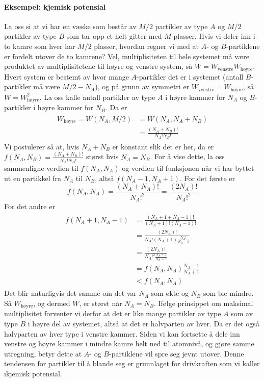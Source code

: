\paragraph{Eksempel: kjemisk potensial} La oss si at vi har en væske som består av $M/2$ partikler av type $A$ og $M/2$ partikler av type $B$ som tar opp et helt gitter med $M$ plasser. Hvis vi deler inn i to kamre som hver har $M/2$ plasser, hvordan regner vi med at $A$- og $B$-partiklene er fordelt utover de to kamrene? Vel, multiplisiteten til hele systemet må være produktet av multiplisitetene til høyre og venstre system, så $W=W_{\text{venstre}}W_{\text{høyre}}$. Hvert system er bestemt av hvor mange $A$-partikler det er i systemet (antall $B$-partikler må være $M/2-N_A$), og på grunn av symmetri er $W_{\text{venstre}}=W_{\text{høyre}}$, så $W=W_{\text{høyre}}^2$. La oss kalle antall partikler av type $A$ i høyre kammer for $N_A$ og $B$-partikler i høyre kammer for $N_B$. Da er
\begin{align}
\begin{split}
	W_{\text{høyre}}=W(N_A,M/2)&=W(N_A,N_A+N_B)\\ &=\frac{(N_A+N_B)!}{N_A!N_B!}
\end{split}
\end{align}
Vi postulerer så at, hvis $N_A+N_B$ er konstant slik det er her, da er $f(N_A,N_B)=\frac{(N_A+N_B)!}{N_A!N_B!}$ størst hvis $N_A=N_B$. For å vise dette, la oss sammenligne verdien til $f(N_A,N_A)$ og verdien til funksjonen når vi har byttet ut en partikkel fra $N_A$ til $N_B$, altså $f(N_A-1,N_A+1)$. For det første er 
\begin{equation}
    f(N_A,N_A)=\frac{(N_A+N_A)!}{N_A!^2}=\frac{(2N_A)!}{N_A!^2}
\end{equation}
For det andre er 
\begin{align}
\begin{split}
    f(N_A+1,N_A-1)&=\frac{(N_A+1+N_A-1)!}{(N_A+1)!(N_A-1)!}\\&=\frac{(2N_A)!}{N_A!(N_A+1)\frac{N_A!}{N_A-1}}\\
    &=\frac{(2N_A)!}{N_A!^2\frac{N_A+1}{N_A-1}}\\
    &=f(N_A,N_A)\frac{N_A-1}{N_A+1}\\
    &<f(N_A,N_A)
\end{split}
\end{align}
Det blir naturligvis det samme om det var $N_A$ som økte og $N_B$ som ble mindre. Så $W_{\text{høyre}}$, og dermed $W$, er størst når $N_{A}=N_{B}$. Ifølge prinsippet om maksimal multiplisitet forventer vi derfor at det er like mange partikler av type $A$ som av type $B$ i høyre del av systemet, altså at det er halvparten av hver. Da er det også halvparten av hver type i venstre kammer. Siden vi kan fortsette å dele inn venstre og høyre kammer i mindre kamre helt ned til atomnivå, og gjøre samme utregning, betyr dette at $A$- og $B$-partiklene vil spre seg jevnt utover. Denne tendensen for partikler til å blande seg er grunnlaget for drivkraften som vi kaller \i{kjemisk potensial}.

